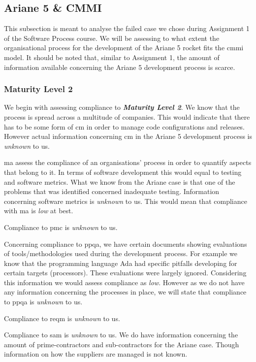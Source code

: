 \subsection{Ariane 5 \& CMMI}
This subsection is meant to analyse the failed case we chose during Assignment 1 of the Software Process course.
We will be assessing to what extent the organisational process for the development of the Ariane 5 rocket fits the \ac{cmmi} model. 
It should be noted that, similar to Assignment 1, the amount of information available concerning the Ariane 5 development process is scarce.

\subsubsection{Maturity Level 2}
We begin with assessing compliance to \textbf{\textit{Maturity Level 2}}. We know that the process is spread across a multitude of companies. This would indicate that there has to be some form of \ac{cm} in order to manage code configurations and releases. However actual information concerning \ac{cm} in the Ariane 5 development process is \textit{unknown} to us. 

\ac{ma} assess the compliance of an organisations' process in order to quantify aspects that belong to it. In terms of software development this would equal to testing and software metrics. What we know from the Ariane case is that one of the problems that was identified concerned inadequate testing. Information concerning software metrics is \textit{unknown} to us. This would mean that compliance with \ac{ma} is \textit{low} at best. 

Compliance to \ac{pmc} is \textit{unknown} to us. 

Concerning compliance to \ac{ppqa}, we have certain documents showing evaluations of tools/methodologies used during the development process. For example we know that the programming language Ada had specific pitfalls developing for certain targets (processors). These evaluations were largely ignored. Considering this information we would assess compliance as \textit{low}. However as we do not have any information concerning the  processes in place, we will state that compliance to \ac{ppqa} is \textit{unknown} to us. 

Compliance to \ac{reqm} is \textit{unknown} to us. 

Compliance to \ac{sam} is \textit{unknown} to us. We do have information concerning the amount of prime-contractors and sub-contractors for the Ariane case. Though information on how the suppliers are managed is not known.

